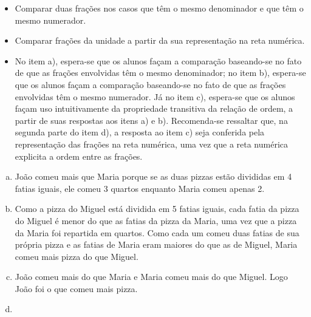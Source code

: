 \begin{multicols}{2}
\begin{objetivos}[label=chap3-ativ8]{}{}

\begin{itemize} %
    \item Comparar  duas frações nos casos  que têm o mesmo denominador e que têm o mesmo numerador.
    \item Comparar frações da unidade a partir da sua representação na reta numérica.
\end{itemize} %
\end{objetivos}

\begin{orientacoes}{}{}
\begin{itemize} %
    \item       No item a), espera-se que os alunos façam a comparação baseando-se no fato de que as frações envolvidas têm o mesmo denominador; no item b), espera-se que os alunos façam a comparação baseando-se no fato de que as frações envolvidas têm o mesmo numerador. Já no item c), espera-se que os alunos façam uso intuitivamente da propriedade transitiva da relação de ordem, a partir de suas respostas aos itens a) e b). Recomenda-se ressaltar que, na segunda parte do item d), a resposta ao item c) seja conferida pela representação das frações na reta numérica, uma vez que a reta numérica explicita a ordem entre as frações.
\end{itemize} %
\end{orientacoes}

\begin{solucao}{}{}
\begin{enumerate} [a)] %
    \item       João comeu mais que Maria porque se as duas pizzas estão divididas em 4 fatias iguais, ele comeu 3 quartos enquanto Maria comeu apenas 2.
    \item Como a pizza do Miguel está dividida em 5 fatias iguais, cada fatia da pizza do Miguel é menor do que as fatias da pizza da Maria, uma vez que a pizza da Maria foi repartida em quartos. Como cada um comeu duas fatias de sua própria pizza e as fatias de Maria eram maiores do que as de Miguel, Maria comeu mais pizza do que Miguel.
    \item João comeu mais do que Maria e Maria comeu mais do que Miguel. Logo João foi o que comeu mais pizza.

    \item \mbox{ }
      

\end{enumerate}
\end{solucao}
\end{multicols}
